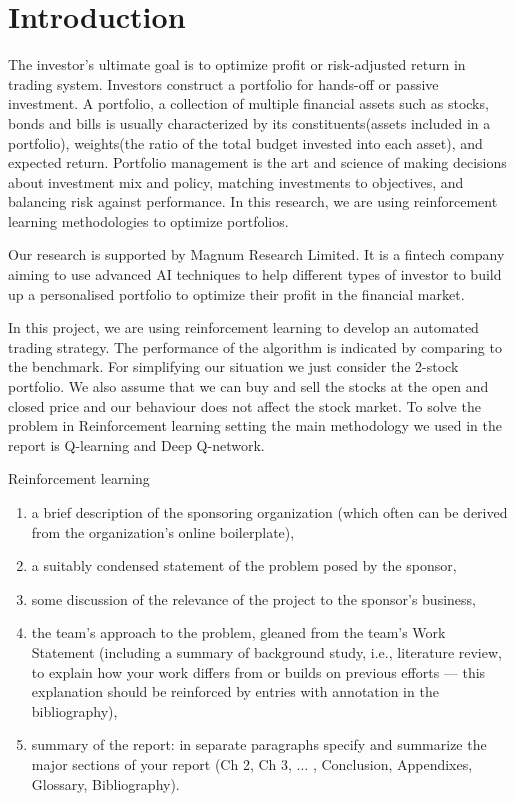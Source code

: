 \chapter{Introduction}\label{Ch:Introduction}

The investor’s ultimate goal is to optimize profit or risk-adjusted return in trading system. Investors construct a portfolio for hands-off or passive investment. A portfolio, a collection of multiple financial assets such as stocks, bonds and bills is usually characterized by its constituents(assets included in a portfolio), weights(the ratio of the total budget invested into each asset), and expected return. Portfolio management is the art and science of making decisions about investment mix and policy, matching investments to objectives, and balancing risk against performance. In this research, we are using reinforcement learning methodologies to optimize portfolios. 

Our research is supported by Magnum Research Limited. It is a fintech company aiming to use advanced AI techniques to help different types of investor to build up a personalised portfolio to optimize their profit in the financial market.

In this project, we are using reinforcement learning to develop an automated trading strategy. The performance of the algorithm is indicated by comparing to the benchmark. For simplifying our situation we just consider the 2-stock portfolio. We also assume that we can buy and sell the stocks at the open and closed price and our behaviour does not affect the stock market. To solve the problem in Reinforcement learning setting the main methodology we used in the report is Q-learning and Deep Q-network. 

Reinforcement learning 
\begin{enumerate}{}
\item a brief description of the sponsoring organization (which often can be derived from the organization's online boilerplate), 
\item a suitably condensed statement of the problem posed by the sponsor, 
\item some discussion of the relevance of the project to the sponsor's business, 
\item the team's approach to the problem, gleaned from the team's Work Statement (including a summary of background study, i.e., literature review, to explain how your work differs from or builds on previous efforts --- this explanation should be reinforced by entries with annotation in the bibliography),
\item summary of the report: in separate paragraphs specify and summarize the major sections of your report (Ch 2, Ch 3, ... , Conclusion,  Appendixes, Glossary, Bibliography).
\end{enumerate}

